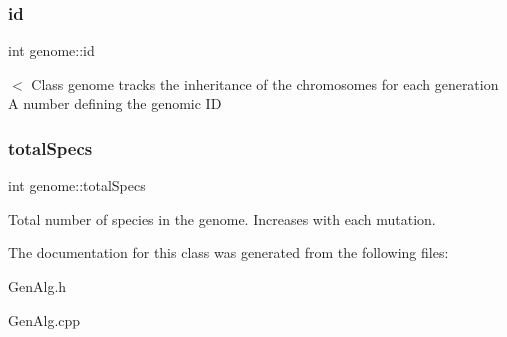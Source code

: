 \subsubsection{\texorpdfstring{id}{id}}
{\footnotesize\ttfamily int genome\+::id}

$<$ Class genome tracks the inheritance of the chromosomes for each generation A number defining the genomic ID \hypertarget{classgenome_a34773e095a642f78ffc33c1ed649c9a7}{}\label{classgenome_a34773e095a642f78ffc33c1ed649c9a7} 
\subsubsection{\texorpdfstring{total\+Specs}{totalSpecs}}
{\footnotesize\ttfamily int genome\+::total\+Specs}

Total number of species in the genome. Increases with each mutation. 

The documentation for this class was generated from the following files\+:\begin{DoxyCompactItemize}
\item 
Gen\+Alg.\+h\item 
Gen\+Alg.\+cpp\end{DoxyCompactItemize}
